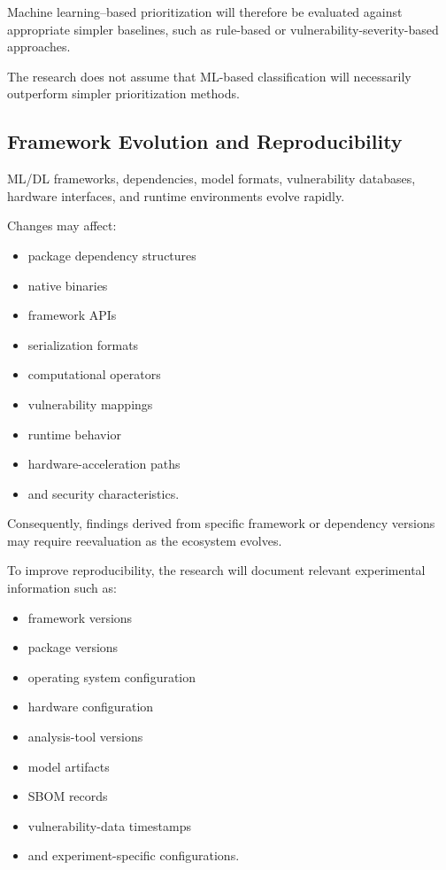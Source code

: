 \documentclass[
  12pt,
  letterpaper,
  oneside]{report}
\providecommand{\tightlist}{%
  \setlength{\itemsep}{0pt}\setlength{\parskip}{0pt}}
\begin{document}
Machine learning--based prioritization will therefore be evaluated
against appropriate simpler baselines, such as rule-based or
vulnerability-severity-based approaches.

The research does not assume that ML-based classification will
necessarily outperform simpler prioritization methods.

\subsection{Framework Evolution and Reproducibility}\label{13110-framework-evolution-and-reproducibility}

ML/DL frameworks, dependencies, model formats, vulnerability databases,
hardware interfaces, and runtime environments evolve rapidly.

Changes may affect:

\begin{itemize}
\tightlist
\item
  package dependency structures
\item
  native binaries
\item
  framework APIs
\item
  serialization formats
\item
  computational operators
\item
  vulnerability mappings
\item
  runtime behavior
\item
  hardware-acceleration paths
\item
  and security characteristics.
\end{itemize}

Consequently, findings derived from specific framework or dependency
versions may require reevaluation as the ecosystem evolves.

To improve reproducibility, the research will document relevant
experimental information such as:

\begin{itemize}
\tightlist
\item
  framework versions
\item
  package versions
\item
  operating system configuration
\item
  hardware configuration
\item
  analysis-tool versions
\item
  model artifacts
\item
  SBOM records
\item
  vulnerability-data timestamps
\item
  and experiment-specific configurations.
\end{itemize}
\end{document}
